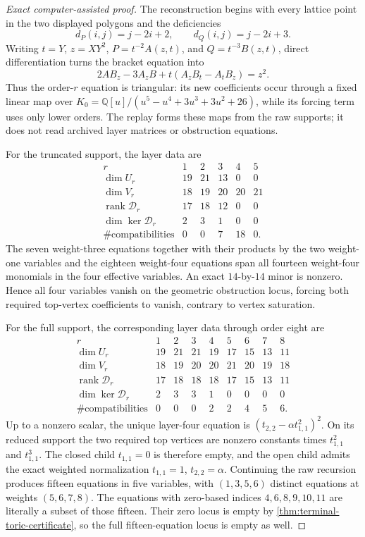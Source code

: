 \begin{proof}[Exact computer-assisted proof]
The reconstruction begins with every lattice point in the two displayed
polygons and the deficiencies
\[
d_P(i,j)=j-2i+2,\qquad d_Q(i,j)=j-2i+3.
\]
Writing \(t=Y\), \(z=XY^2\), \(P=t^{-2}A(z,t)\), and
\(Q=t^{-3}B(z,t)\), direct differentiation turns the bracket equation into
\[
2AB_z-3A_zB+t(A_zB_t-A_tB_z)=z^2.
\]
Thus the order-\(r\) equation is triangular: its new coefficients occur
through a fixed linear map over
\(K_0=\mathbb Q[u]/(u^5-u^4+3u^3+3u^2+26)\), while its forcing term uses
only lower orders.  The replay forms these maps from the raw supports; it
does not read archived layer matrices or obstruction equations.

For the truncated support, the layer data are
\[
\begin{array}{c|rrrrr}
r&1&2&3&4&5\\ \hline
\dim U_r&19&21&13&0&0\\
\dim V_r&18&19&20&20&21\\
\operatorname{rank}\mathscr D_r&17&18&12&0&0\\
\dim\ker\mathscr D_r&2&3&1&0&0\\
\#\text{compatibilities}&0&0&7&18&0.
\end{array}
\]
The seven weight-three equations together with their products by the two
weight-one variables and the eighteen weight-four equations span all
fourteen weight-four monomials in the four effective variables.  An exact
\(14\)-by-\(14\) minor is nonzero.  Hence all four variables vanish on the
geometric obstruction locus, forcing both required top-vertex coefficients
to vanish, contrary to vertex saturation.

For the full support, the corresponding layer data through order eight are
\[
\begin{array}{c|rrrrrrrr}
r&1&2&3&4&5&6&7&8\\ \hline
\dim U_r&19&21&21&19&17&15&13&11\\
\dim V_r&18&19&20&20&21&20&19&18\\
\operatorname{rank}\mathscr D_r&17&18&18&18&17&15&13&11\\
\dim\ker\mathscr D_r&2&3&3&1&0&0&0&0\\
\#\text{compatibilities}&0&0&0&2&2&4&5&6.
\end{array}
\]
Up to a nonzero scalar, the unique layer-four equation is
\((t_{2,2}-\alpha t_{1,1}^2)^2\).  On its reduced support the two required
top vertices are nonzero constants times \(t_{1,1}^2\) and
\(t_{1,1}^3\).  The closed child \(t_{1,1}=0\) is therefore empty, and the
open child admits the exact weighted normalization \(t_{1,1}=1\),
\(t_{2,2}=\alpha\).  Continuing the raw recursion produces fifteen
equations in five variables, with \((1,3,5,6)\) distinct equations at
weights \((5,6,7,8)\).  The equations with zero-based indices
\(4,6,8,9,10,11\) are literally a subset of those fifteen.  Their zero
locus is empty by \cref{thm:terminal-toric-certificate}, so the full
fifteen-equation locus is empty as well.


\end{proof}

